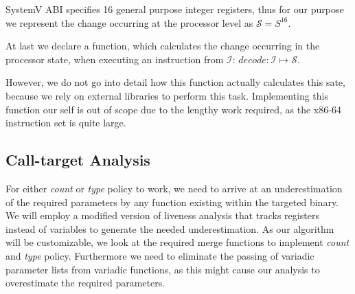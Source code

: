 SystemV ABI specifies 16 general purpose integer registers, thus for our purpose we represent the change occurring at the processor level as $\mathcal{S} = S^{16}$.

At last we declare a function, which calculates the change occurring in the processor state, when executing an instruction from $\mathcal{I}$:
$decode : \mathcal{I} \mapsto \mathcal{S}$.

However, we do not go into detail how this function actually calculates this sate, because we rely on external libraries to perform this task. Implementing this function our self is out of scope due to the lengthy work required, as the x86-64 instruction set is quite large.

\subsection{Call-target Analysis}
\label{section:calltargetanalysis}
For either \emph{count} or \emph{type} policy to work, we need to arrive at an underestimation of the required parameters by any function existing within the targeted 
binary. We will employ a modified version of liveness analysis that tracks registers instead of variables to generate the needed underestimation. As our algorithm will 
be customizable, we look at the required merge functions to implement \emph{count} and \emph{type} policy. Furthermore we need to eliminate the passing of variadic 
parameter lists from variadic functions, as this might cause our analysis to overestimate the required parameters.

